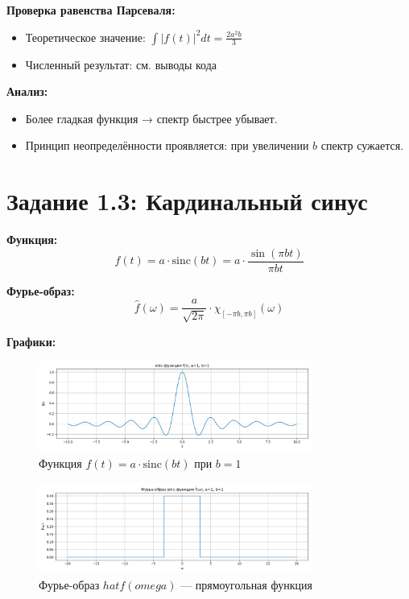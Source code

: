 \textbf{Проверка равенства Парсеваля:}

\begin{itemize}
    \item Теоретическое значение: $\displaystyle \int |f(t)|^2 dt = \frac{2 a^2 b}{3}$
    \item Численный результат: см. выводы кода
\end{itemize}

\textbf{Анализ:}

\begin{itemize}
    \item Более гладкая функция → спектр быстрее убывает.
    \item Принцип неопределённости проявляется: при увеличении $b$ спектр сужается.
\end{itemize}

\section*{Задание 1.3: Кардинальный синус}

\textbf{Функция:}
\[
f(t) = a \cdot \mathrm{sinc}(bt) = a \cdot \frac{\sin(\pi b t)}{\pi b t}
\]

\textbf{Фурье-образ:}
\[
\hat{f}(\omega) = \frac{a}{\sqrt{2\pi}} \cdot \chi_{[-\pi b, \pi b]}(\omega)
\]

\textbf{Графики:}

\begin{figure}[h!]
    \centering
    \includegraphics[width=0.8\textwidth]{sinc_function_b1.png}
    \caption{Функция $f(t) = a \cdot \mathrm{sinc}(bt)$ при $b = 1$}
\end{figure}

\begin{figure}[h!]
    \centering
    \includegraphics[width=0.8\textwidth]{sinc_spectrum_b1.png}
    \caption{Фурье-образ $hat{f}(omega)$ — прямоугольная функция}
\end{figure}

